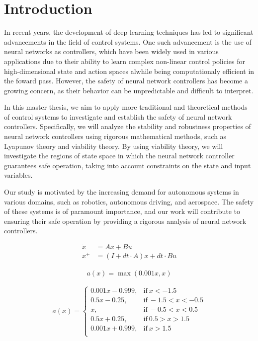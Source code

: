 % 

\section{Introduction}

In recent years, the development of deep learning techniques has led to significant 
advancements in the field of control systems. One such advancement is the use of neural 
networks as controllers, which have been widely used in various applications due to 
their ability to learn complex non-linear control policies for high-dimensional state and action 
spaces alwhile being computationaly efficient in the foward pass.
However, the safety of neural network controllers has become a growing concern, 
as their behavior can be unpredictable and difficult to interpret.

In this master thesis, we aim to apply more traditional and theoretical methods of control 
systems to investigate and establish the safety of neural network controllers. Specifically, 
we will analyze the stability and robustness properties of neural network controllers using 
rigorous mathematical methods, such as Lyapunov theory and viability theory. By using viability 
theory, we will investigate the regions of state space in which the neural network controller 
guarantees safe operation, taking into account constraints on the state and input variables.

Our study is motivated by the increasing demand for autonomous systems in various domains, 
such as robotics, autonomous driving, and aerospace. The safety of these systems is of 
paramount importance, and our work will contribute to ensuring their safe operation by 
providing a rigorous analysis of neural network controllers.



\begin{align}
    \dot x &= Ax + Bu\\
    x^{+} &= (I + dt \cdot A)x + dt \cdot Bu
\end{align}

\begin{align}
    a(x) = \max{(0.001x, x)}
\end{align}

\begin{equation}
    a(x)=
    \begin{cases}
      0.001x - 0.999, & \text{if}\ x< -1.5 \\
      0.5x - 0.25, & \text{if}\ -1.5<x< -0.5 \\
      x, & \text{if}\ -0.5<x< 0.5 \\
      0.5x + 0.25, & \text{if}\ 0.5 > x > 1.5 \\
      0.001x + 0.999, & \text{if}\ x>1.5 \\
    \end{cases}
\end{equation}

